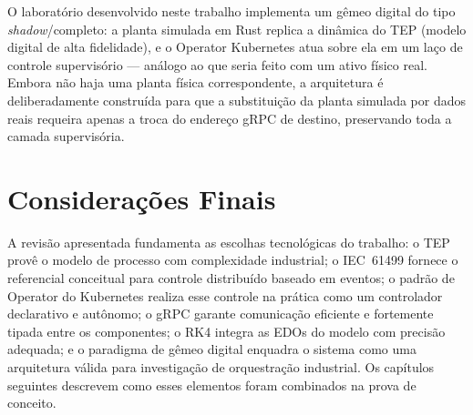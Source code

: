 O laboratório desenvolvido neste trabalho implementa um gêmeo digital do tipo \textit{shadow}/completo: a planta simulada em Rust replica a dinâmica do TEP (modelo digital de alta fidelidade), e o Operator Kubernetes atua sobre ela em um laço de controle supervisório — análogo ao que seria feito com um ativo físico real. Embora não haja uma planta física correspondente, a arquitetura é deliberadamente construída para que a substituição da planta simulada por dados reais requeira apenas a troca do endereço gRPC de destino, preservando toda a camada supervisória.

\section{Considerações Finais}
\label{sec:ref_conclusao}

A revisão apresentada fundamenta as escolhas tecnológicas do trabalho: o TEP provê o modelo de processo com complexidade industrial; o IEC~61499 fornece o referencial conceitual para controle distribuído baseado em eventos; o padrão de Operator do Kubernetes realiza esse controle na prática como um controlador declarativo e autônomo; o gRPC garante comunicação eficiente e fortemente tipada entre os componentes; o RK4 integra as EDOs do modelo com precisão adequada; e o paradigma de gêmeo digital enquadra o sistema como uma arquitetura válida para investigação de orquestração industrial. Os capítulos seguintes descrevem como esses elementos foram combinados na prova de conceito.
